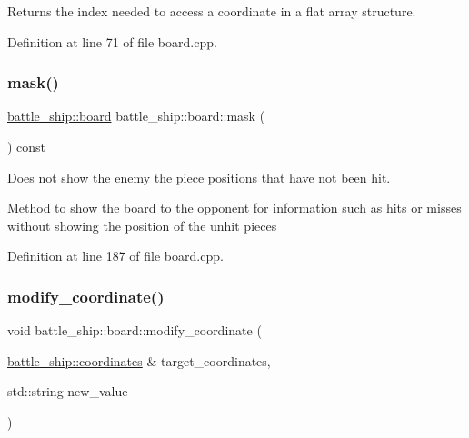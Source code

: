 Returns the index needed to access a coordinate in a flat array structure. 



Definition at line 71 of file board.\+cpp.

\mbox{\label{classbattle__ship_1_1board_a0dd14fd999e0359ad0a3ecee47fe639d}} 
\subsubsection{\texorpdfstring{mask()}{mask()}}
{\footnotesize\ttfamily \hyperlink{classbattle__ship_1_1board}{battle\+\_\+ship\+::board} battle\+\_\+ship\+::board\+::mask (\begin{DoxyParamCaption}{ }\end{DoxyParamCaption}) const}



Does not show the enemy the piece positions that have not been hit. 

Method to show the board to the opponent for information such as hits or misses without showing the position of the unhit pieces 

Definition at line 187 of file board.\+cpp.

\mbox{\label{classbattle__ship_1_1board_a1c79f537306e8f2f84c8aa41a90430e6}} 
\subsubsection{\texorpdfstring{modify\+\_\+coordinate()}{modify\_coordinate()}}
{\footnotesize\ttfamily void battle\+\_\+ship\+::board\+::modify\+\_\+coordinate (\begin{DoxyParamCaption}\item[{\hyperlink{structbattle__ship_1_1coordinates}{battle\+\_\+ship\+::coordinates} \&}]{target\+\_\+coordinates,  }\item[{std\+::string}]{new\+\_\+value }\end{DoxyParamCaption})}




